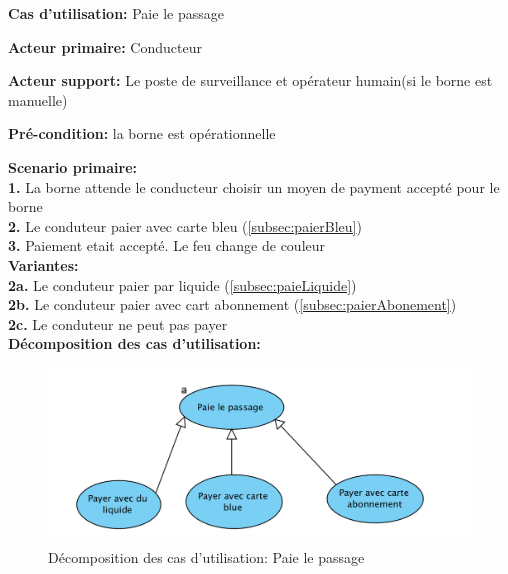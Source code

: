 \textbf{Cas d'utilisation:} Paie le passage

\textbf{Acteur primaire:} Conducteur

\textbf{Acteur support:} Le poste de surveillance et opérateur humain(si le borne est manuelle)

\textbf{Pré-condition: }  la borne est opérationnelle
 

\textbf{Scenario primaire: } \\
    \textbf{1.} La borne attende le conducteur choisir un moyen de payment accepté pour le borne\\
    \textbf{2.} Le conduteur paier avec carte bleu (\ref{subsec:paierBleu})\\
    \textbf{3.} Paiement etait accepté. Le feu change de couleur\\

\textbf{Variantes:}\\
    \textbf{2a.} Le conduteur paier par liquide (\ref{subsec:paieLiquide})\\
    \textbf{2b.} Le conduteur paier avec cart abonnement (\ref{subsec:paierAbonement})\\
    \textbf{2c.} Le conduteur ne peut pas payer \\ %

\textbf{Décomposition des cas d'utilisation:} 
\begin{figure}[h]
    \centering
    \includegraphics[scale=0.7]{02_Desenvolvimento/TD2/images/paierInclusion.png}
    \caption{Décomposition des cas d'utilisation: Paie le passage}
\end{figure}